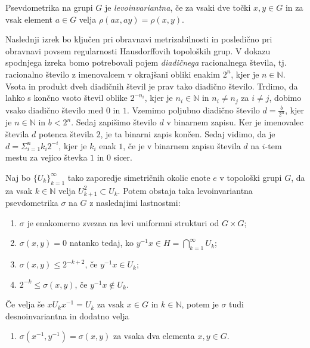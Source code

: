 \documentclass[mat1]{fmfdelo}
\newcommand{\N}{\mathbb N}
\begin{document}
\begin{definicija}
Psevdometrika na grupi $G$ je \emph{levoinvariantna}, če za vsaki dve točki $x, y \in G$ in za vsak element $a \in G$ velja $\rho(ax, ay) = \rho(x, y)$.
\end{definicija}

Naslednji izrek bo ključen pri obravnavi metrizabilnosti in posledično pri obravnavi povsem regularnosti Hausdorffovih topoloških grup.
V dokazu spodnjega izreka bomo potrebovali pojem \emph{diadičnega} racionalnega števila, tj. racionalno število z imenovalcem v okrajšani obliki enakim $2^n$, kjer je $n \in \N$. Vsota in produkt dveh diadičnih števil je prav tako diadično število. Trdimo, da lahko s končno vsoto števil oblike $2^{-n_i}$, kjer je $n_i \in \N$ in $n_i \neq n_j$ za $i \neq j$, dobimo vsako diadično število med $0$ in $1$.
Vzemimo poljubno diadično število $d = \frac{b}{2^n}$, kjer je $n \in \N$ in $b < 2^n$. Sedaj zapišimo število $d$ v binarnem zapisu. Ker je imenovalec števila $d$ potenca števila $2$, je ta binarni zapis končen. Sedaj vidimo, da je $d = \Sigma_{i=1}^n k_i2^{-i}$, kjer je $k_i$ enak $1$, če je v binarnem zapisu števila $d$ na $i$-tem mestu za vejico števka $1$ in $0$ sicer. 

\begin{izrek}\label{izr:pseudometrika}
	Naj bo $\lbrace U_k \rbrace_{k = 1}^{\infty}$ tako zaporedje simetričnih okolic enote $e$ v topološki grupi $G$, da za vsak $k \in \N$ velja $U_{k+1}^2 \subset U_k$. Potem obstaja taka levoinvariantna psevdometrika $\sigma$ na $G$ z naslednjimi lastnostmi:
	\begin{enumerate}
		\item $\sigma$ je enakomerno zvezna na levi uniformni strukturi od $G \times G$;\label{last:psevdo1}
		\item $\sigma (x, y) = 0$ natanko tedaj, ko $y^{-1}x \in H = \bigcap_{k=1}^{\infty} U_k$;\label{last:psevdo2}
		\item $\sigma (x, y) \leq 2^{-k+2}$, če $y^{-1}x \in U_k$;\label{last:psevdo3}
		\item $2^{-k} \leq \sigma (x, y)$, če $y^{-1}x \notin U_k$.\label{last:psevdo4}
	\end{enumerate}
	
	Če velja še $x U_k x^{-1} = U_k$ za vsak $x \in G$ in $k \in \N$, potem je $\sigma$ tudi desnoinvariantna in dodatno velja
	\begin{enumerate}[resume]
		\item $\sigma (x^{-1}, y^{-1}) = \sigma (x, y)$ za vsaka dva elementa $x, y \in G$.\label{last:psevdo5}
	\end{enumerate}
\end{izrek}
\end{document}
